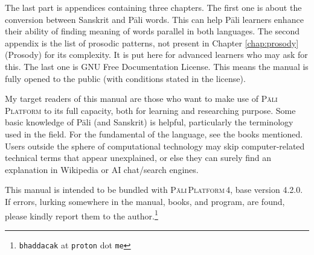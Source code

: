 The last part is appendices containing three chapters. The first one is about the conversion between Sanskrit and Pāli words. This can help Pāli learners enhance their ability of finding meaning of words parallel in both languages. The second appendix is the list of prosodic patterns, not present in Chapter \ref{chap:prosody} (Prosody) for its complexity. It is put here for advanced learners who may ask for this. The last one is GNU Free Documentation License. This means the manual is fully opened to the public (with conditions stated in the license).

My target readers of this manual are those who want to make use of \textsc{Pāli\,Platform} to its full capacity, both for learning and researching purpose. Some basic knowledge of Pāli (and Sanskrit) is helpful, particularly the terminology used in the field. For the fundamental of the language, see the books mentioned. Users outside the sphere of computational technology may skip computer-related technical terms that appear unexplained, or else they can surely find an explanation in Wikipedia or AI chat/search engines.

This manual is intended to be bundled with \textsc{Pāli\,Platform\,4}, base version 4.2.0. If errors, lurking somewhere in the manual, books, and program, are found, please kindly report them to the author.\footnote{\texttt{bhaddacak} at \texttt{proton} dot \texttt{me}}

